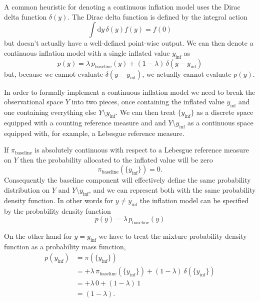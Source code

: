 \documentclass[
  letterpaper,
  DIV=11,
  numbers=noendperiod]{scrartcl}
\begin{document}
A common heuristic for denoting a continuous inflation model uses the
Dirac delta function \(\delta(y)\). The Dirac delta function is defined
by the integral action \[
\int \mathrm{d} y \, \delta(y) f(y) = f(0)
\] but doesn't actually have a well-defined point-wise output. We can
then denote a continuous inflation model with a single inflated value
\(y_{\mathrm{inf}}\) as \[
p(y)
=
  \lambda       \, p_{\mathrm{baseline}}(y)
+ (1 - \lambda) \, \delta(y - y_{\mathrm{inf}})
\] but, because we cannot evaluate \(\delta(y - y_{\mathrm{inf}})\), we
actually cannot evaluate \(p(y)\).

In order to formally implement a continuous inflation model we need to
break the observational space \(Y\) into two pieces, once containing the
inflated value \(y_{\mathrm{inf}}\) and one containing everything else
\(Y \setminus y_{\mathrm{inf}}\). We can then treat
\(\{ y_{\mathrm{inf}}\}\) as a discrete space equipped with a counting
reference measure and and \(Y \setminus y_{\mathrm{inf}}\) as a
continuous space equipped with, for example, a Lebesgue reference
measure.

If \(\pi_{\mathrm{baseline}}\) is absolutely continuous with respect to
a Lebesgue reference measure on \(Y\) then the probability allocated to
the inflated value will be zero \[
\pi_{\mathrm{baseline}}( \{ y_{\mathrm{inf}} \} ) = 0.
\] Consequently the baseline component will effectively define the same
probability distribution on \(Y\) and \(Y \setminus y_{\mathrm{inf}}\),
and we can represent both with the same probability density function. In
other words for \(y \ne y_{\mathrm{inf}}\) the inflation model can be
specified by the probability density function \[
p(y)
=
\lambda \, p_{\mathrm{baseline}}(y)
\]

On the other hand for \(y = y_{\mathrm{inf}}\) we have to treat the
mixture probability density function as a probability mass function,
\begin{align*}
p( y_{\mathrm{inf}} )
&=
\pi( \{ y_{\mathrm{inf}} \} )
\\
&=
+ \lambda \, \pi_{\mathrm{baseline}}( \{ y_{\mathrm{inf}} \} )
+ (1 - \lambda) \, \delta( \{ y_{\mathrm{inf}} \} )
\\
&=
+ \lambda \, 0
+ (1 - \lambda) \, 1
\\
&=
(1 - \lambda).
\end{align*}
\end{document}
